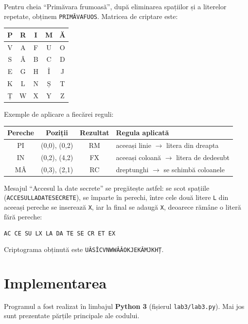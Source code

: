 \documentclass[12pt,a4paper]{article}
\begin{document}
Pentru cheia \enquote{Primăvara frumoasă}, după eliminarea spațiilor și a literelor
repetate, obținem \texttt{PRIMĂVAFUOS}. Matricea de criptare este:

\begin{center}
\renewcommand{\arraystretch}{1.3}
\begin{tabular}{|c|c|c|c|c|}
\hline
P & R & I & M & Ă \\ \hline
V & A & F & U & O \\ \hline
S & Â & B & C & D \\ \hline
E & G & H & Î & J \\ \hline
K & L & N & Ș & T \\ \hline
Ț & W & X & Y & Z \\ \hline
\end{tabular}
\end{center}

Exemple de aplicare a fiecărei reguli:

\begin{center}
\renewcommand{\arraystretch}{1.3}
\begin{tabular}{@{}cccl@{}}
\toprule
\textbf{Pereche} & \textbf{Poziții} & \textbf{Rezultat} & \textbf{Regula aplicată} \\
\midrule
PI & (0,0), (0,2) & RM & aceeași linie $\rightarrow$ litera din dreapta \\
IN & (0,2), (4,2) & FX & aceeași coloană $\rightarrow$ litera de dedesubt \\
MÂ & (0,3), (2,1) & RC & dreptunghi $\rightarrow$ se schimbă coloanele \\
\bottomrule
\end{tabular}
\end{center}

Mesajul \enquote{Accesul la date secrete} se pregătește astfel: se scot spațiile
(\texttt{ACCESULLADATESECRETE}), se împarte în perechi, între cele două litere
\texttt{L} din aceeași pereche se inserează \texttt{X}, iar la final se adaugă
\texttt{X}, deoarece rămâne o literă fără pereche:
\begin{center}
\texttt{AC CE SU LX LA DA TE SE CR ET EX}
\end{center}
Criptograma obținută este \texttt{UÂSÎCVNWWÂÂOKJEKÂMJKHȚ}.

\section{Implementarea}

Programul a fost realizat în limbajul \textbf{Python 3} (fișierul
\texttt{lab3/lab3.py}). Mai jos sunt prezentate părțile principale ale codului.
\end{document}
